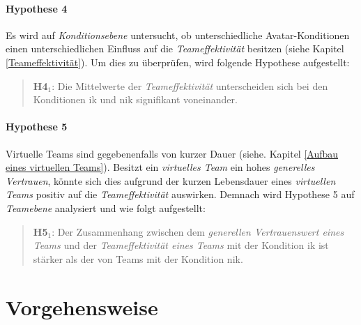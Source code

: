 \documentclass[a4paper,11pt]{article}%
\renewcommand{\\}{\vspace*{0.5\baselineskip} \newline}
\begin{document}
\paragraph{Hypothese 4}
Es wird auf \textit{Konditionsebene} untersucht, ob unterschiedliche Avatar-Konditionen einen unterschiedlichen Einfluss auf die \textit{Teameffektivität} besitzen (siehe Kapitel \ref{Teameffektivität}).
Um dies zu überprüfen, wird folgende Hypothese aufgestellt:
\begin{quote}
\textbf{H4$_{1}$}: Die Mittelwerte der \textit{Teameffektivität} unterscheiden sich bei den Konditionen \newline \ac{ik} und \ac{nik} signifikant voneinander.
\end{quote}

\newpage
\paragraph{Hypothese 5}
Virtuelle Teams sind gegebenenfalls von kurzer Dauer (siehe. Kapitel \ref{Aufbau eines virtuellen Teams}). Besitzt ein \textit{virtuelles Team} ein hohes \textit{generelles Vertrauen}, könnte sich dies aufgrund der kurzen Lebensdauer eines \textit{virtuellen Teams} positiv auf die \textit{Teameffektivität} auswirken. Demnach wird Hypothese 5 auf \textit{Teamebene} analysiert und wie folgt aufgestellt:
\begin{quote}
\textbf{H5$_{1}$}: Der Zusammenhang zwischen dem \textit{generellen Vertrauenswert eines Teams} und der \textit{Teameffektivität eines Teams} mit der Kondition \ac{ik} ist stärker als der von Teams mit der Kondition \ac{nik}.
\end{quote}
\newpage
\section{Vorgehensweise}
\end{document}
